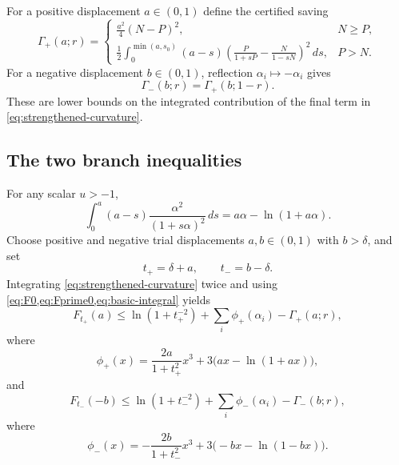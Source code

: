 \documentclass[11pt]{article}
\theoremstyle{definition}
\begin{document}
For a positive displacement $a\in(0,1)$ define the certified saving
\begin{equation}
  \Gamma_+(a;r)=
  \begin{cases}
  \displaystyle \frac{a^2}{4}(N-P)^2,&N\ge P,\\[2.5ex]
  \displaystyle \frac12\int_0^{\min(a,s_0)}(a-s)
  \left(\frac{P}{1+sP}-\frac{N}{1-sN}\right)^2\,ds,&P>N.
  \end{cases}
  \label{eq:Gamma-plus}
\end{equation}
For a negative displacement $b\in(0,1)$, reflection $\alpha_i\mapsto-\alpha_i$ gives
\begin{equation}
  \Gamma_-(b;r)=\Gamma_+(b;1-r).
  \label{eq:Gamma-minus}
\end{equation}
These are lower bounds on the integrated contribution of the final term in \cref{eq:strengthened-curvature}.

\subsection{The two branch inequalities}
For any scalar $u>-1$,
\begin{equation}
  \int_0^a(a-s)\frac{\alpha^2}{(1+s\alpha)^2}\,ds
  =a\alpha-\ln(1+a\alpha).
  \label{eq:basic-integral}
\end{equation}
Choose positive and negative trial displacements $a,b\in(0,1)$ with $b>\delta$, and set
\begin{equation}
  t_+=\delta+a,
  \qquad
  t_-=b-\delta.
  \label{eq:tpm}
\end{equation}
Integrating \cref{eq:strengthened-curvature} twice and using \cref{eq:F0,eq:Fprime0,eq:basic-integral} yields
\begin{equation}
  F_{t_+}(a)
  \le \ln(1+t_+^{-2})+\sum_i\phi_+(\alpha_i)-\Gamma_+(a;r),
  \label{eq:positive-branch}
\end{equation}
where
\begin{equation}
  \phi_+(x)=\frac{2a}{1+t_+^2}x^3+3\bigl(ax-\ln(1+ax)\bigr),
  \label{eq:phi-plus}
\end{equation}
and
\begin{equation}
  F_{t_-}(-b)
  \le \ln(1+t_-^{-2})+\sum_i\phi_-(\alpha_i)-\Gamma_-(b;r),
  \label{eq:negative-branch}
\end{equation}
where
\begin{equation}
  \phi_-(x)=-\frac{2b}{1+t_-^2}x^3+3\bigl(-bx-\ln(1-bx)\bigr).
  \label{eq:phi-minus}
\end{equation}
\end{document}

